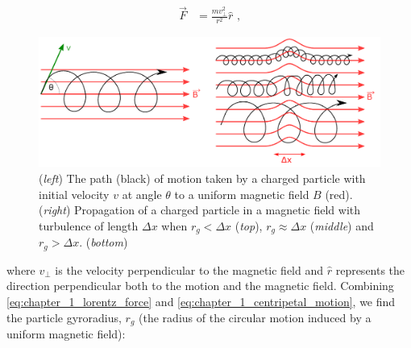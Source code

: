 \begin{equation}
    \begin{aligned}
    \vec{F}&=\frac{mv_\perp^2}{r^2}\hat{r}\text{ ,}
    \end{aligned} \label{eq:chapter_1_centripetal_motion}
\end{equation}
\begin{figure}[b!]
    \centering
    \includegraphics[width=1.0\textwidth]{04_Introduction/Images/cosmic_rays/combined_turbulence.pdf}
    \caption{ (\textit{left}) The path (black) of motion taken by a charged particle with initial velocity $v$ at angle $\theta$ to a uniform magnetic field $B$ (red). (\textit{right}) Propagation of a charged particle in a magnetic field  with turbulence of length $\Delta x$ when $r_g<\Delta x$ (\textit{top}), $r_g\approx \Delta x$ (\textit{middle}) and $r_g>\Delta x$. (\textit{bottom})}
    \label{fig:01_CR_in_Bfield}
\end{figure}

\noindent where $v_\perp$ is the velocity perpendicular to the magnetic field and $\hat{r}$ represents the direction perpendicular both to the motion and the magnetic field. Combining \autoref{eq:chapter_1_lorentz_force} and \autoref{eq:chapter_1_centripetal_motion}, we find the particle gyroradius, $r_g$ (the radius of the circular motion induced by a uniform magnetic field):

